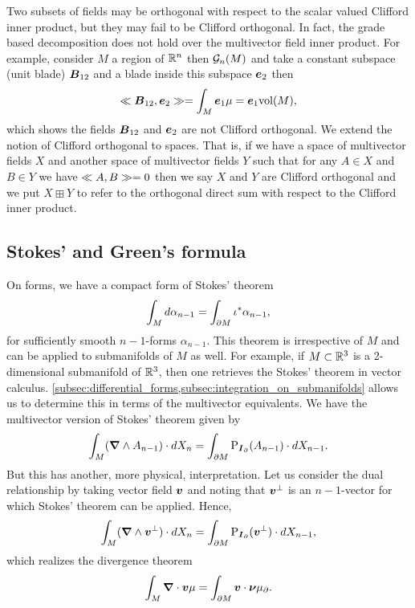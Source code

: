 Two subsets of fields may be orthogonal with respect to the scalar valued Clifford inner product, but they may fail to be Clifford orthogonal. In fact, the grade based decomposition does not hold over the multivector field inner product. For example, consider $M$ a region of $\mathbb{R}^n$ then $\mathcal{G}_n(M)$ and take a constant subspace (unit blade) $\boldsymbol{B}_{12}$ and a blade inside this subspace $\boldsymbol{e}_2$ then
\begin{equation}
\ll \boldsymbol{B}_{12}, \boldsymbol{e}_2\gg = \int_M  \boldsymbol{e}_1 \mu = \boldsymbol{e}_1 \textrm{vol}(M),
\end{equation}
which shows the fields $\boldsymbol{B}_{12}$ and $\boldsymbol{e}_2$ are not Clifford orthogonal.
We extend the notion of Clifford orthogonal to spaces. That is, if we have a space of multivector fields $X$ and another space of multivector fields $Y$ such that for any $A\in X$ and $B\in Y$ we have $\ll A, B\gg=0$ then we say $X$ and $Y$ are Clifford orthogonal and we put $X \boxplus Y$ to refer to the orthogonal direct sum with respect to the Clifford inner product.



\subsection{Stokes' and Green's formula}
On forms, we have a compact form of Stokes' theorem
\begin{equation}
\int_M d \alpha_{n-1} = \int_{{\partial M}} \iota^* \alpha_{n-1},
\end{equation}
for sufficiently smooth $n-1$-forms $\alpha_{n-1}$. This theorem is irrespective of $M$ and can be applied to submanifolds of $M$ as well. For example, if $M\subset \mathbb{R}^3$ is a 2-dimensional submanifold of $\mathbb{R}^3$, then one retrieves the Stokes' theorem in vector calculus. \cref{subsec:differential_forms,subsec:integration_on_submanifolds} allows us to determine this in terms of the multivector equivalents. We have the multivector version of Stokes' theorem given by
\begin{equation}
\label{eq:stokes_theorem}
\int_M (\boldsymbol{\nabla} \wedge A_{n-1})\cdot dX_n = \int_{\partial M} \operatorname{P}_{\boldsymbol{I}_\partial}(A_{n-1}) \cdot dX_{n-1}.
\end{equation}
But this has another, more physical, interpretation. Let us consider the dual relationship by taking vector field $\boldsymbol{v}$ and noting that $\boldsymbol{v}^\perp$ is an $n-1$-vector for which Stokes' theorem can be applied. Hence,
\begin{equation}
\label{eq:stokes_theorem_dual}
\int_M (\boldsymbol{\nabla} \wedge \boldsymbol{v}^\perp) \cdot dX_n = \int_{\partial M} \operatorname{P}_{\boldsymbol{I}_\partial}(\boldsymbol{v}^\perp) \cdot dX_{n-1},
\end{equation}
which realizes the divergence theorem
\begin{equation}
\int_M \boldsymbol{\nabla} \cdot \boldsymbol{v} \mu = \int_{\partial M} \boldsymbol{v}\cdot \boldsymbol{\nu} \mu_\partial.
\end{equation}

